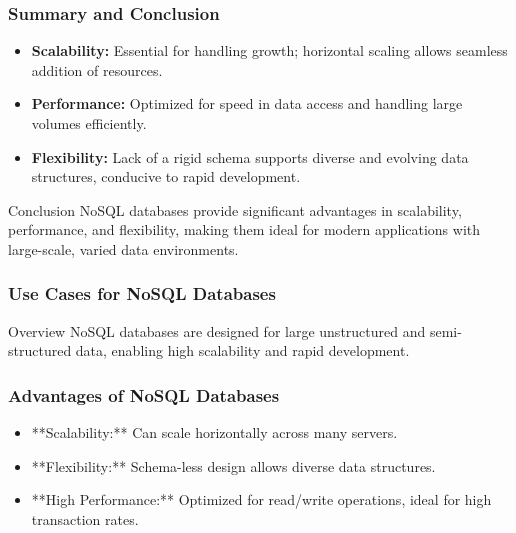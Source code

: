 \documentclass[aspectratio=169]{beamer}
\begin{document}
\begin{frame}[fragile]
    \frametitle{Summary and Conclusion}
    \begin{itemize}
        \item \textbf{Scalability:} Essential for handling growth; horizontal scaling allows seamless addition of resources.
        \item \textbf{Performance:} Optimized for speed in data access and handling large volumes efficiently.
        \item \textbf{Flexibility:} Lack of a rigid schema supports diverse and evolving data structures, conducive to rapid development.
    \end{itemize}
    
    \begin{block}{Conclusion}
        NoSQL databases provide significant advantages in scalability, performance, and flexibility, making them ideal for modern applications with large-scale, varied data environments.
    \end{block}
\end{frame}

\begin{frame}[fragile]
    \frametitle{Use Cases for NoSQL Databases}
    \begin{block}{Overview}
        NoSQL databases are designed for large unstructured and semi-structured data, enabling high scalability and rapid development.
    \end{block}
\end{frame}

\begin{frame}[fragile]
    \frametitle{Advantages of NoSQL Databases}
    \begin{itemize}
        \item **Scalability:** Can scale horizontally across many servers.
        \item **Flexibility:** Schema-less design allows diverse data structures.
        \item **High Performance:** Optimized for read/write operations, ideal for high transaction rates.
    \end{itemize}
\end{frame}
\end{document}

